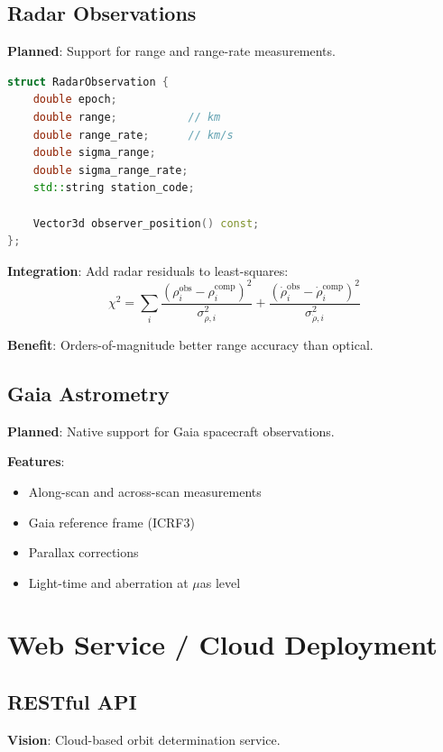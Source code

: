 \subsection{Radar Observations}

\textbf{Planned}: Support for range and range-rate measurements.

\begin{lstlisting}[language=C++]
struct RadarObservation {
    double epoch;
    double range;           // km
    double range_rate;      // km/s
    double sigma_range;
    double sigma_range_rate;
    std::string station_code;
    
    Vector3d observer_position() const;
};
\end{lstlisting}

\textbf{Integration}: Add radar residuals to least-squares:
\[
\chi^2 = \sum_i \frac{(\rho_i^{\text{obs}} - \rho_i^{\text{comp}})^2}{\sigma_{\rho,i}^2} + \frac{(\dot{\rho}_i^{\text{obs}} - \dot{\rho}_i^{\text{comp}})^2}{\sigma_{\dot{\rho},i}^2}
\]

\textbf{Benefit}: Orders-of-magnitude better range accuracy than optical.

\subsection{Gaia Astrometry}

\textbf{Planned}: Native support for Gaia spacecraft observations.

\textbf{Features}:
\begin{itemize}
    \item Along-scan and across-scan measurements
    \item Gaia reference frame (ICRF3)
    \item Parallax corrections
    \item Light-time and aberration at $\mu$as level
\end{itemize}

\section{Web Service / Cloud Deployment}

\subsection{RESTful API}

\textbf{Vision}: Cloud-based orbit determination service.

